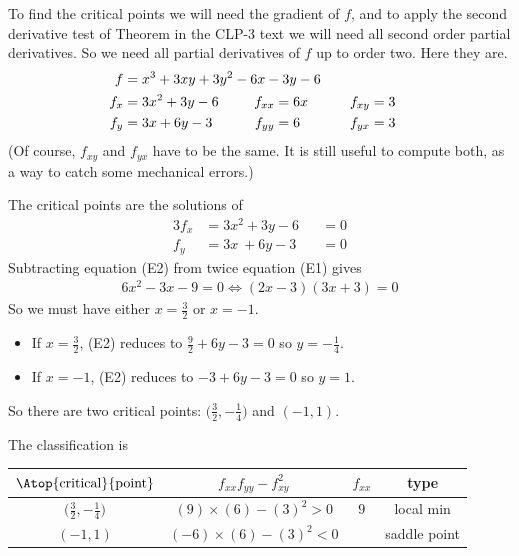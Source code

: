 \begin{solution}
To find the critical points we will need the
gradient of $f$, and to apply the second derivative test of 
Theorem  in the CLP-3 text 
we will need all 
second order partial derivatives. So we need all partial derivatives of
$f$ up to order two.
Here they are.
\begin{alignat*}{3}
f&=x^3+3xy+3y^2-6x-3y-6 \hidewidth\\
f_x&=3x^2+3y-6   & f_{xx}&=6x \qquad & f_{xy}&= 3\\
f_y&=3x+6y-3 \qquad & f_{yy}&=6\qquad & f_{yx}&= 3
\end{alignat*}
(Of course, $f_{xy}$ and $f_{yx}$ have to be the same. It is still
useful to compute both, as a way to catch some mechanical errors.)

The critical points are the solutions of
\begin{alignat*}{3}
f_x&=3x^2+3y-6&&=0  \tag{E1} \\
f_y&=3x\ +6y-3 &&= 0  \tag{E2}
\end{alignat*}
Subtracting equation (E2) from twice equation (E1) gives
\begin{align*}
6x^2-3x-9=0
\iff (2x-3)(3x+3)=0
\end{align*}
So we must have either $x=\frac{3}{2}$ or $x=-1$.
\begin{itemize}
\item 
If $x=\frac{3}{2}$, (E2) reduces to $\frac{9}{2}+6y-3=0$ so $y=-\frac{1}{4}$.
\item 
If $x=-1$, (E2) reduces to $-3+6y-3=0$ so $y=1$.
\end{itemize}
So there are two critical points: $\big(\frac{3}{2},-\frac{1}{4}\big)$ and
$(-1,1)$.


The classification is
\begin{center}
\renewcommand{\arraystretch}{1.3}
     \begin{tabular}{|c|c|c|c|}
     \hline
    $\Atop{\text{critical}}{\text{point}}$  & $f_{xx}f_{yy}-f_{xy}^2$ & 
                                                          $f_{xx}$ & type \\    
    \hline
     $\big(\frac{3}{2},-\frac{1}{4}\big)$  & $(9)\times (6)-(3)^2> 0$ &  $9$  & local min  \\ \hline
     $(-1,1)$  & $(-6)\times (6)-(3)^2<0$ &  & saddle point \\  \hline
     \end{tabular}
\renewcommand{\arraystretch}{1.0}
\end{center}
 \end{solution}

